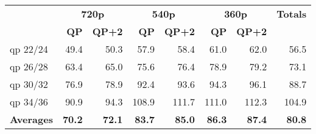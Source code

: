 \begin{table}[htbp]
{\begin{tabular}{l|rr|rr|rr|r}
       & \multicolumn{2}{c|}{\textbf{720p}} & \multicolumn{2}{c|}{\textbf{540p}} & \multicolumn{2}{c|}{\textbf{360p}} & \multicolumn{1}{c}{\textbf{Totals}} \\
       & \textbf{QP} & \textbf{QP+2} & \textbf{QP} & \textbf{QP+2} & \textbf{QP} & \textbf{QP+2} &  \\
    qp 22/24 & 49.4 & 50.3 & 57.9 & 58.4 & 61.0 & 62.0 & 56.5 \\
    qp 26/28 & 63.4 & 65.0 & 75.6 & 76.4 & 78.9 & 79.2 & 73.1 \\
    qp 30/32 & 76.9 & 78.9 & 92.4 & 93.6 & 94.3 & 96.1 & 88.7 \\
    qp 34/36 & 90.9 & 94.3 & 108.9 & 111.7 & 111.0 & 112.3 & 104.9 \\
    \textbf{Averages} & \textbf{70.2} & \textbf{72.1} & \textbf{83.7} & \textbf{85.0} & \textbf{86.3} & \textbf{87.4} & \textbf{80.8} \\
    \bottomrule
    \end{tabular}%
  }
  \label{tab:sbh0_pruning_rdoq0_pp_l3}%
\end{table}%
